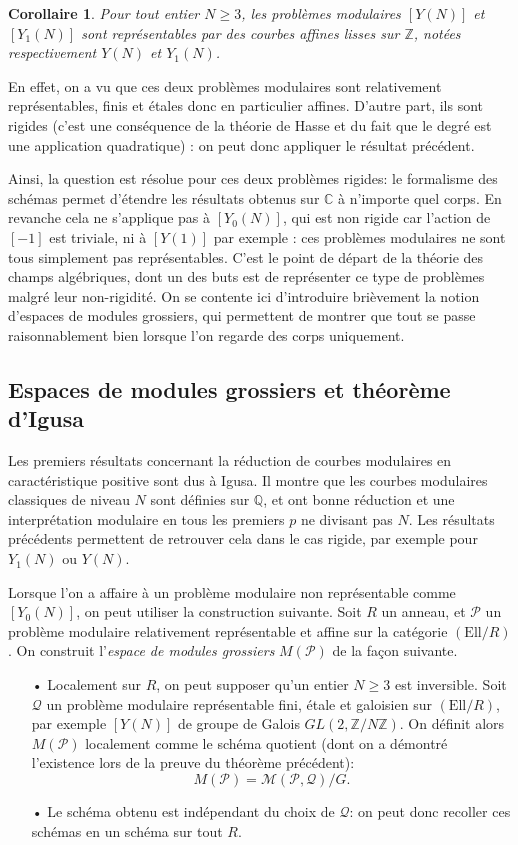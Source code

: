 \documentclass[11pt,a4paper]{article}
\newcommand{\Z}{\mathbb{Z}}
\newcommand{\C}{\mathbb{C}}
\newcommand{\Q}{\mathbb{Q}}
\renewcommand{\Pr}{\mathcal{P}}
\newcommand{\Qr}{\mathcal{Q}}
\newcommand{\M}{\mathcal{M}}
\newcommand{\Ell}{\mathrm{Ell}}
\renewcommand{\v}{\vspace{5mm}}
\newtheorem*{cor}{Corollaire}
\theoremstyle{definition}
\begin{document}
\begin{cor}
Pour tout entier $N\geq 3$, les problèmes modulaires $[Y(N)]$ et $[Y_1(N)]$ sont représentables par des courbes affines lisses sur $\Z$, notées respectivement $Y(N)$ et $Y_1(N)$.
\end{cor}

En effet, on a vu que ces deux problèmes modulaires sont relativement représentables, finis et étales donc en particulier affines. D'autre part, ils sont rigides (c'est une conséquence de la théorie de Hasse et du fait que le degré est une application quadratique) : on peut donc appliquer le résultat précédent.

Ainsi, la question est résolue pour ces deux problèmes rigides: le formalisme des schémas permet d'étendre les résultats obtenus sur $\C$ à n'importe quel corps. En revanche cela ne s'applique pas à $[Y_0(N)]$, qui est non rigide car l'action de $[-1]$ est triviale, ni à $[Y(1)]$ par exemple : ces problèmes modulaires ne sont tous simplement pas représentables. C'est le point de départ de la théorie des champs algébriques, dont un des buts est de représenter ce type de problèmes malgré leur non-rigidité. On se contente ici d'introduire brièvement la notion d'espaces de modules grossiers, qui permettent de montrer que tout se passe raisonnablement bien lorsque l'on regarde des corps uniquement.


\subsection{Espaces de modules grossiers et théorème d'Igusa}

Les premiers résultats concernant la réduction de courbes modulaires en caractéristique positive sont dus à Igusa. Il montre que les courbes modulaires classiques de niveau $N$ sont définies sur $\Q$, et ont bonne réduction et une interprétation modulaire en tous les premiers $p$ ne divisant pas $N$. Les résultats précédents permettent de retrouver cela dans le cas rigide, par exemple pour $Y_1(N)$ ou $Y(N)$.
\v

Lorsque l'on a affaire à un problème modulaire non représentable comme $[Y_0(N)]$, on peut utiliser la construction suivante. Soit $R$ un anneau, et $\Pr$ un problème modulaire relativement représentable et affine sur la catégorie $(\Ell/R)$. On construit l'\emph{espace de modules grossiers} $M(\Pr)$ de la façon suivante.
\begin{itemize}
\item[•] Localement sur $R$, on peut supposer qu'un entier $N\geq 3$ est inversible. Soit $\Qr$ un problème modulaire représentable fini, étale et galoisien sur $(\Ell/R)$, par exemple $[Y(N)]$ de groupe de Galois $GL(2, \Z/N\Z)$. On définit alors $M(\Pr)$ localement comme le schéma quotient (dont on a démontré l'existence lors de la preuve du théorème précédent):
$$M(\Pr) = \M(\Pr,\Qr)/G.$$
\item[•] Le schéma obtenu est indépendant du choix de $\Qr$: on peut donc recoller ces schémas en un schéma sur tout $R$.
\end{itemize}
\end{document}
